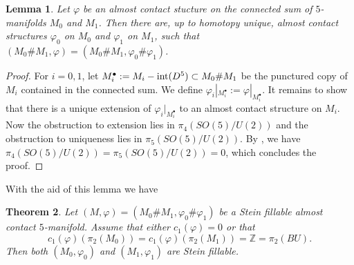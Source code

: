 \documentclass[12pt]{amsart}
\newcommand\Z{\mathbb{Z}}
\newcommand\acs{\varphi}  				%
\newtheorem{Theorem}{Theorem}[section]
\newtheorem{Lemma}[Theorem]{Lemma}
\theoremstyle{remark}
\begin{document}
\begin{Lemma} \label{lem:5d-almost-contact-disconnected-sum}
Let $\acs$ be an almost contact stucture on the connected sum of $5$-manifolds
$M_0$ and $M_1$.  Then there are, up to homotopy unique, 
almost contact structures $\acs_0$ on $M_0$ and $\acs_1$ on $M_1$, such that $(M_0 \# M_1, 
\acs) = (M_0 \# M_1, \acs_0 \# \acs_1)$.
\end{Lemma}

\begin{proof}
For $i = 0, 1$, let $M_i^\bullet := M_i - {\rm int}(D^5) \subset M_0 \# M_1$ be the 
punctured copy of $M_i$ contained in the connected sum.  We define $\acs_i|_{M_i^\bullet} := \acs|_{M_i^\bullet}$.
It remains to show that there is a unique extension of $\acs_i|_{M_i^\bullet}$ to an almost contact structure 
on $M_i$.  Now the obstruction to extension lies in $\pi_4(SO(5)/U(2))$ and the obstruction to uniqueness 
lies in $\pi_5(SO(5)/U(2))$.  By \cite{Massey61}, we have 
$\pi_4(SO(5)/U(2)) = \pi_5(SO(5)/U(2)) = 0$, which concludes the proof.
\end{proof}
\noindent With the aid of this lemma we have
\begin{Theorem}\label{thm:5fill-main}
Let $(M, \acs) = (M_0 \# M_1, \acs_0 \# \acs_1)$ be a Stein fillable almost contact $5$-manifold.
Assume that either $c_1(\acs) = 0$ or that
%
\[ c_1(\acs)(\pi_2(M_0)) = c_1(\acs)(\pi_2(M_1))  = \Z = \pi_2(BU).\]
%
Then both $(M_0, \acs_0)$ and $(M_1, \acs_1)$ are Stein fillable.
%
\end{Theorem}

%
%
%
%
\end{document}
